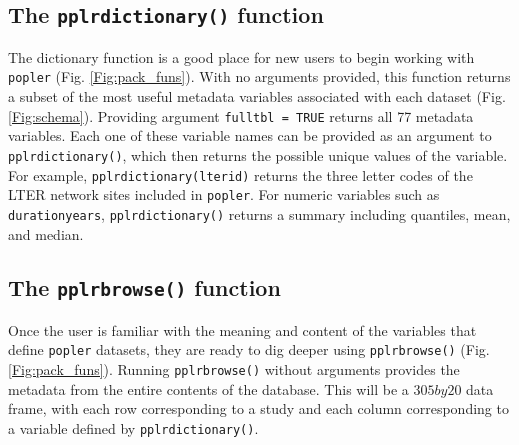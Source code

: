 \documentclass{article}\usepackage[]{graphicx}\usepackage[]{color}
\begin{document}
\subsection*{The \texttt{pplr\textunderscore dictionary()} function}
The dictionary function is a good place for new users to begin working with \texttt{popler} (Fig. \ref{Fig:pack_funs}). With no arguments provided, this function returns a subset of the most useful metadata variables associated with each  dataset (Fig. \ref{Fig:schema}). Providing argument \texttt{full\textunderscore tbl = TRUE} returns all 77 metadata variables. Each one of these variable names can be provided as an argument to \texttt{pplr\textunderscore dictionary()}, which then returns the possible unique values of the variable. For example, \texttt{pplr\textunderscore dictionary(lterid)} returns the three letter codes of the LTER network sites included in \texttt{popler}. For numeric variables such as \texttt{duration\textunderscore years}, \texttt{pplr\textunderscore dictionary()} returns a summary including quantiles, mean, and median. 

\subsection*{The \texttt{pplr\textunderscore browse()} function}
Once the user is familiar with the meaning and content of the variables that define \texttt{popler} datasets, they are ready to dig deeper using \texttt{pplr\textunderscore browse()} (Fig. \ref{Fig:pack_funs}). Running \texttt{pplr\textunderscore browse()} without arguments provides the metadata from the entire contents of the database. This will be a $305 by 20$ data frame, with each row corresponding to a study and each column corresponding to a variable defined by \texttt{pplr\textunderscore dictionary()}.
\end{document}
